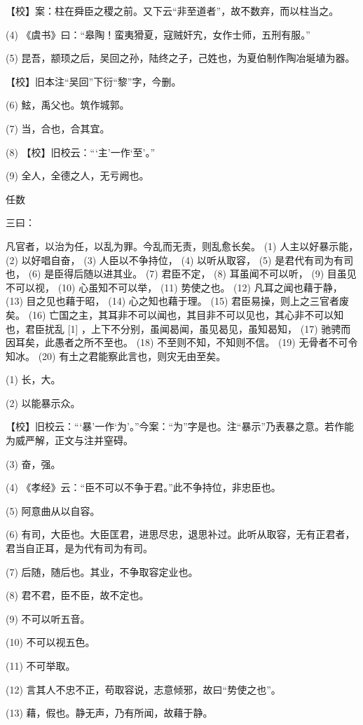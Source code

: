 \documentclass[12pt,UTF8]{ctexbook}
\begin{document}
【校】案：柱在舜臣之稷之前。又下云“非至道者”，故不数弃，而以柱当之。

(4) 《虞书》曰：“皋陶！蛮夷猾夏，寇贼奸宄，女作士师，五刑有服。”

(5) 昆吾，颛顼之后，吴回之孙，陆终之子，己姓也，为夏伯制作陶冶埏埴为器。

【校】旧本注“吴回”下衍“黎”字，今删。

(6) 鮌，禹父也。筑作城郭。

(7) 当，合也，合其宜。

(8) 【校】旧校云：“‘主’一作‘至’。”

(9) 全人，全德之人，无亏阙也。





任数


三曰：

凡官者，以治为任，以乱为罪。今乱而无责，则乱愈长矣。 (1) 人主以好暴示能， (2) 以好唱自奋， (3) 人臣以不争持位， (4) 以听从取容， (5) 是君代有司为有司也， (6) 是臣得后随以进其业。 (7) 君臣不定， (8) 耳虽闻不可以听， (9) 目虽见不可以视， (10) 心虽知不可以举， (11) 势使之也。 (12) 凡耳之闻也藉于静， (13) 目之见也藉于昭， (14) 心之知也藉于理。 (15) 君臣易操，则上之三官者废矣。 (16) 亡国之主，其耳非不可以闻也，其目非不可以见也，其心非不可以知也，君臣扰乱 [1] ，上下不分别，虽闻曷闻，虽见曷见，虽知曷知， (17) 驰骋而因耳矣，此愚者之所不至也。 (18) 不至则不知，不知则不信。 (19) 无骨者不可令知冰。 (20) 有土之君能察此言也，则灾无由至矣。

(1) 长，大。

(2) 以能暴示众。

【校】旧校云：“‘暴’一作‘为’。”今案：“为”字是也。注“暴示”乃表暴之意。若作能为威严解，正文与注并窒碍。

(3) 奋，强。

(4) 《孝经》云：“臣不可以不争于君。”此不争持位，非忠臣也。

(5) 阿意曲从以自容。

(6) 有司，大臣也。大臣匡君，进思尽忠，退思补过。此听从取容，无有正君者，君当自正耳，是为代有司为有司。

(7) 后随，随后也。其业，不争取容定业也。

(8) 君不君，臣不臣，故不定也。

(9) 不可以听五音。

(10) 不可以视五色。

(11) 不可举取。

(12) 言其人不忠不正，苟取容说，志意倾邪，故曰“势使之也”。

(13) 藉，假也。静无声，乃有所闻，故藉于静。
\end{document}
